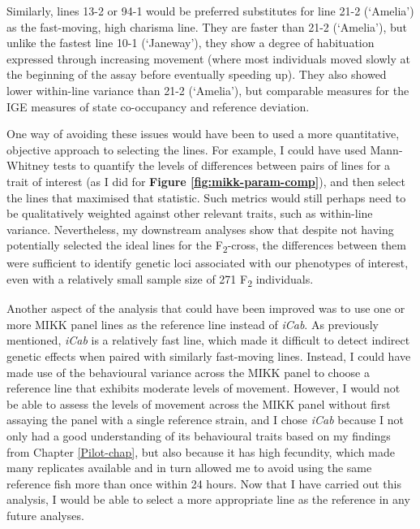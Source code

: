 \documentclass[
]{book}
\begin{document}
Similarly, lines \textcolor{13-2_F57A5F}{13-2} or \textcolor{94-1_D39200}{94-1} would be preferred substitutes for line \textcolor{21-2 (‘Amelia’)_49B500}{21-2 (‘Amelia’)} as the fast-moving, high charisma line. They are faster than \textcolor{21-2 (‘Amelia’)_49B500}{21-2 (‘Amelia’)}, but unlike the fastest line \textcolor{10-1 (‘Janeway’)_F8766D}{10-1 (‘Janeway’)}, they show a degree of habituation expressed through increasing movement (where most individuals moved slowly at the beginning of the assay before eventually speeding up). They also showed lower within-line variance than \textcolor{21-2 (‘Amelia’)_49B500}{21-2 (‘Amelia’)}, but comparable measures for the IGE measures of state co-occupancy and reference deviation.

One way of avoiding these issues would have been to used a more quantitative, objective approach to selecting the lines. For example, I could have used Mann-Whitney tests to quantify the levels of differences between pairs of lines for a trait of interest (as I did for \textbf{Figure \ref{fig:mikk-param-comp}}), and then select the lines that maximised that statistic. Such metrics would still perhaps need to be qualitatively weighted against other relevant traits, such as within-line variance. Nevertheless, my downstream analyses show that despite not having potentially selected the ideal lines for the F\textsubscript{2}-cross, the differences between them were sufficient to identify genetic loci associated with our phenotypes of interest, even with a relatively small sample size of 271 F\textsubscript{2} individuals.

Another aspect of the analysis that could have been improved was to use one or more MIKK panel lines as the reference line instead of \emph{\textcolor{iCab_424B4D}{iCab}}. As previously mentioned, \emph{\textcolor{iCab_424B4D}{iCab}} is a relatively fast line, which made it difficult to detect indirect genetic effects when paired with similarly fast-moving lines. Instead, I could have made use of the behavioural variance across the MIKK panel to choose a reference line that exhibits moderate levels of movement. However, I would not be able to assess the levels of movement across the MIKK panel without first assaying the panel with a single reference strain, and I chose \emph{\textcolor{iCab_424B4D}{iCab}} because I not only had a good understanding of its behavioural traits based on my findings from Chapter \ref{Pilot-chap}, but also because it has high fecundity, which made many replicates available and in turn allowed me to avoid using the same reference fish more than once within 24 hours. Now that I have carried out this analysis, I would be able to select a more appropriate line as the reference in any future analyses.
\end{document}
